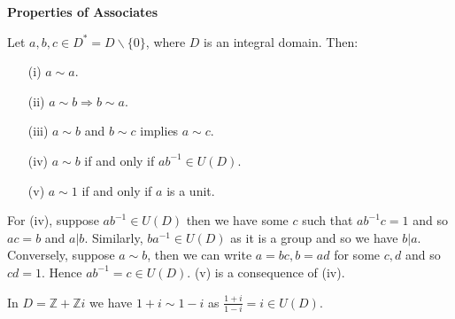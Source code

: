 \begin{center} {\bf Properties of Associates}
\end{center}
Let $a,b,c \in D^*=D \backslash \{0\}$, where $D$ is an integral domain. Then:
\begin{enumerate}
\item[(i)] $a \sim a$.
\item[(ii)] $a \sim b \Rightarrow b \sim a$.
\item[(iii)] $a \sim b$ and $b \sim c$ implies $a \sim c$.
\item[(iv)] $a \sim b$ if and only if $ab^{-1} \in U(D)$.
\item[(v)] $a \sim 1$ if and only if $a$ is a unit.
\end{enumerate}
For (iv), suppose $ab^{-1} \in U(D)$ then we have some $c$ such that $ab^{-1}c=1$ and so $ac=b$ and $a|b$.
Similarly, $ba^{-1} \in U(D)$ as it is a group and so we have $b|a$.
Conversely, suppose $a \sim b$, then we can write $a=bc,b=ad$ for some $c,d$ and so
$cd=1$. Hence $ab^{-1}=c \in U(D)$. (v) is a consequence of (iv).
\begin{example} In $D=\mathbb{Z}+\mathbb{Z}i$ we have $1+i \sim 1-i$ as $\frac{1+i}{1-i}=i \in U(D)$.
\end{example}

